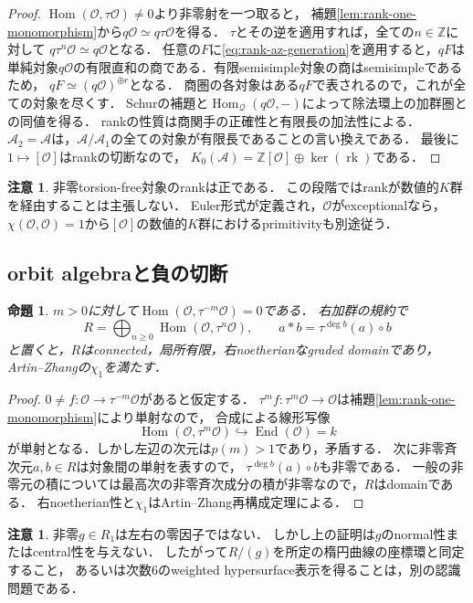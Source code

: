 \documentclass[11pt,a4paper]{ltjsarticle}
\newtheorem{proposition}[theorem]{命題}
\theoremstyle{definition}
\newtheorem{remark}[theorem]{注意}
\newcommand{\OO}{\mathcal O}
\renewcommand{\AA}{\mathcal A}
\newcommand{\Hom}{\operatorname{Hom}}
\newcommand{\End}{\operatorname{End}}
\newcommand{\rk}{\operatorname{rk}}
\begin{document}
\begin{proof}
$\Hom(\OO,\tau\OO)\ne0$より非零射を一つ取ると，
補題\ref{lem:rank-one-monomorphism}から$q\OO\simeq q\tau\OO$を得る．
$\tau$とその逆を適用すれば，全ての$n\in\mathbb Z$に対して
$q\tau^n\OO\simeq q\OO$となる．
任意の$F$に\eqref{eq:rank-az-generation}を適用すると，$qF$は
単純対象$q\OO$の有限直和の商である．有限semisimple対象の商はsemisimpleであるため，
$qF\simeq(q\OO)^{\oplus r}$となる．
商圏の各対象はある$qF$で表されるので，これが全ての対象を尽くす．
Schurの補題と$\Hom_{\mathcal Q}(q\OO,-)$によって除法環上の加群圏との同値を得る．
rankの性質は商関手の正確性と有限長の加法性による．
$\AA_2=\AA$は，$\AA/\AA_1$の全ての対象が有限長であることの言い換えである．
最後に$1\mapsto[\OO]$はrankの切断なので，
$K_0(\AA)=\mathbb Z[\OO]\oplus\ker(\rk)$である．
\end{proof}

\begin{remark}
非零torsion-free対象のrankは正である．
この段階ではrankが数値的$K$群を経由することは主張しない．
Euler形式が定義され，$\OO$がexceptionalなら，
$\chi(\OO,\OO)=1$から$[\OO]$の数値的$K$群におけるprimitivityも別途従う．
\end{remark}

\subsection{orbit algebraと負の切断}

\begin{proposition}\label{prop:orbit-domain-negative}
$m>0$に対して$\Hom(\OO,\tau^{-m}\OO)=0$である．
右加群の規約で
\[
 R=\bigoplus_{n\geq0}\Hom(\OO,\tau^n\OO),\qquad
 a*b=\tau^{\deg b}(a)\circ b
\]
と置くと，$R$はconnected，局所有限，右noetherianなgraded domainであり，
Artin--Zhangの$\chi_1$を満たす．
\end{proposition}

\begin{proof}
$0\ne f:\OO\to\tau^{-m}\OO$があると仮定する．
$\tau^mf:\tau^m\OO\to\OO$は補題\ref{lem:rank-one-monomorphism}により単射なので，
合成による線形写像
\[
 \Hom(\OO,\tau^m\OO)\hookrightarrow\End(\OO)=k
\]
が単射となる．しかし左辺の次元は$p(m)>1$であり，矛盾する．
次に非零斉次元$a,b\in R$は対象間の単射を表すので，
$\tau^{\deg b}(a)\circ b$も非零である．
一般の非零元の積については最高次の非零斉次成分の積が非零なので，$R$はdomainである．
右noetherian性と$\chi_1$はArtin--Zhang再構成定理による．
\end{proof}

\begin{remark}
非零$g\in R_1$は左右の零因子ではない．
しかし上の証明は$g$のnormal性またはcentral性を与えない．
したがって$R/(g)$を所定の楕円曲線の座標環と同定すること，
あるいは次数6のweighted hypersurface表示を得ることは，別の認識問題である．
\end{remark}
\end{document}
